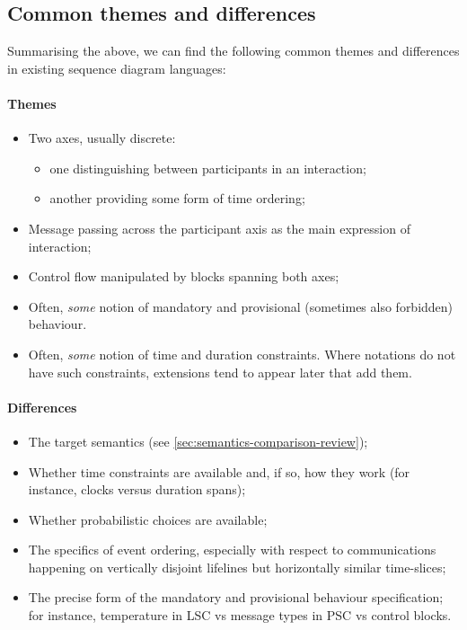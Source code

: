 \subsection{Common themes and differences}

Summarising the above, we can find the following common
themes and differences in existing sequence
diagram languages:

\paragraph{Themes}

\begin{itemize}
\item
  Two axes, usually discrete:
  \begin{itemize}
  \item
    one distinguishing between participants in an interaction;
  \item
    another providing some form of time ordering;
  \end{itemize}
\item
  Message passing across the participant axis as the main expression of
  interaction;
\item
  Control flow manipulated by blocks 
  spanning both axes;
\item
  Often, \emph{some} notion of mandatory and provisional
  (sometimes also forbidden) behaviour.
\item
  Often, \emph{some} notion of time and duration constraints.  Where notations
  do not have such constraints, extensions tend to appear later that add them.
\end{itemize}

\paragraph{Differences}

\begin{itemize}
\item
  The target semantics (see \cref{sec:semantics-comparison-review});
\item
  Whether time constraints are available and, if so, how they work
  (for instance, clocks versus duration spans);
\item
  Whether probabilistic choices are available;
\item
  The specifics of event ordering, especially with respect to communications
  happening on vertically disjoint lifelines but horizontally
  similar time-slices;
\item
  The precise form of the mandatory and provisional
  behaviour specification; for instance, temperature in LSC
  vs message types in PSC vs control blocks.
\end{itemize}

